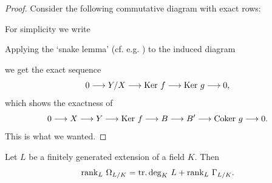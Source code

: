\documentclass[../main]{subfiles}
\begin{document}
\begin{proof}
Consider the following commutative diagram with exact rows:

\begin{center}
\end{center}

For simplicity we write

\begin{center}
\end{center}

Applying the `snake lemma' (cf. e.g. \cite[Ch. 1]{bourbaki1998commutative}) to the induced diagram

\begin{center}
\end{center}

we get the exact sequence \[0 \longrightarrow Y/X \longrightarrow \operatorname{Ker} \, f \longrightarrow \operatorname{Ker} \, g \longrightarrow 0,\] which shows the exactness of \[0 \longrightarrow X \longrightarrow Y \longrightarrow \operatorname{Ker} \, f \longrightarrow B \longrightarrow B' \longrightarrow \operatorname{Coker} \, g \longrightarrow 0.\] This is what we wanted.
\end{proof}

\begin{partheorem}
\label{thm:092} 
Let $L$ be a finitely generated extension of a field $K$. Then
\[
\operatorname{rank}_L \, \Omega_{L/K} = \operatorname{tr. deg}_K \, L + \operatorname{rank}_L \, \Gamma_{L/K}.
\]
\end{partheorem}
\end{document}
